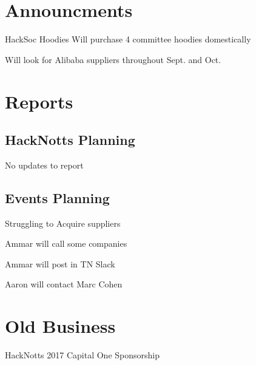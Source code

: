 \documentclass[11pt,hacksoc]{meetingmins}
\begin{document}
\maketitle

\section{Announcments}
\begin{items}
	\item
	HackSoc Hoodies
		\subitem
		Will purchase 4 committee hoodies domestically
		
		\subitem
		Will look for Alibaba suppliers throughout Sept. and Oct.
\end{items}

\section{Reports}

\subsection{HackNotts Planning}
\begin{hiddensubitems}
	\item
	No updates to report
	
\end{hiddensubitems}

\subsection{Events Planning}
\begin{hiddensubitems}
	\item
	Struggling to Acquire suppliers
	
	\item
	Ammar will call some companies
	
	\item
	Ammar will post in TN Slack
	
	\item
	Aaron will contact Marc Cohen
	
\end{hiddensubitems}

\section{Old Business}
\begin{items}
	\item
	HackNotts 2017 Capital One Sponsorship
\end{items}
\end{document}
